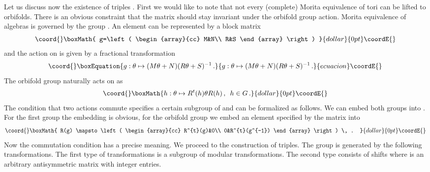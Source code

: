 \documentclass[a4paper,a4paper]{article}
\begin{document}
{Let us discuss now the existence of triples \coordHE{}. 
First we would like to note that not every (complete) Morita equivalence of tori can be lifted 
to orbifolds. There is an obvious constraint that the matrix \myHighlight{$\theta$}\coordHE{} should stay invariant under the orbifold 
group action. Morita equivalence of \coordHE{} algebras is governed by the group \coordHE{}. 
An element \coordHE{} can be represented by a \coordHE{} block matrix 
$$\coord{}\boxMath{
g=\left( 
\begin{array}{cc}
M&N\\
R&S
\end{array}
\right)
}{dollar}{0pt}\coordE{}$$
and the action on \myHighlight{$\theta$}\coordHE{} is given by a fractional transformation
\begin{equation}\coord{}\boxEquation{\label{fractr}
g: \theta \mapsto (M\theta + N)(R\theta + S)^{-1} \, .
}{g: \theta \mapsto (M\theta + N)(R\theta + S)^{-1} \, .
}{ecuacion}\coordE{}\end{equation}
The orbifold group \coordHE{} naturally acts on \myHighlight{$\theta$}\coordHE{} as 
$$\coord{}\boxMath{
h: \theta \mapsto R^{t}(h) \theta R(h) \, , \enspace h\in G \, .
}{dollar}{0pt}\coordE{}$$
The condition that two actions commute specifies a certain subgroup of \coordHE{} and 
can be  formalized as follows. We can embed both groups into \coordHE{}. For the 
first group the embedding is obvious, for the orbifold group we embed an element specified by the matrix \coordHE{} 
into 
$$\coord{}\boxMath{
R(g) \mapsto \left( 
\begin{array}{cc}
R^{t}(g)&0\\
0&R^{t}(g^{-1})
\end{array}
\right) \, .
}{dollar}{0pt}\coordE{}$$  
Now the commutation condition has a precise meaning. We proceed to the construction of  \coordHE{} triples. 
The group \coordHE{} is generated by the following transformations. 
The first type of transformations is a subgroup \coordHE{} of modular transformations. The second type consists 
of shifts \coordHE{} where \coordHE{} is an arbitrary antisymmetric matrix with integer entries. 
}
\end{document}
